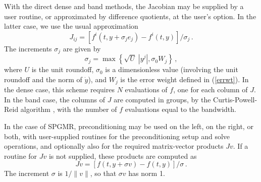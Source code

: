 With the direct dense and band methods, the Jacobian may be supplied
by a user routine, or approximated by difference quotients,
at the user's option.  In the latter case, we use the usual
approximation
\[ J_{ij} = [f^i(t,y+\sigma_j e_j) - f^i(t,y)]/\sigma_j \, . \]
The increments $\sigma_j$ are given by
\[ \sigma_j = \max\left\{\sqrt{U} \; |y^j| , \sigma_0 W_j \right\} \, , \]
where $U$ is the unit roundoff, $\sigma_0$ is a dimensionless value
(involving the unit roundoff and the norm of $\dot{y}$),
and $W_j$ is the error weight defined in (\ref{errwt}).  In the dense
case, this scheme requires $N$ evaluations of $f$, one for each column
of $J$.  In the band case, the columns of $J$ are computed in groups,
by the Curtis-Powell-Reid algorithm \cite{CPR:74}, with the number of
$f$ evaluations equal to the bandwidth.

In the case of SPGMR, preconditioning may be used on the left, on the
right, or both, with user-supplied routines for the preconditioning
setup and solve operations, and optionally also for the required
matrix-vector products $Jv$.  If a routine for $Jv$ is not supplied,
these products are computed as
\begin{equation}\label{jacobv}
Jv = [f(t,y+\sigma v) - f(t,y)]/\sigma \, .
\end{equation}
The increment $\sigma$ is $1/\|v\|$, so that $\sigma v$ has norm 1.


